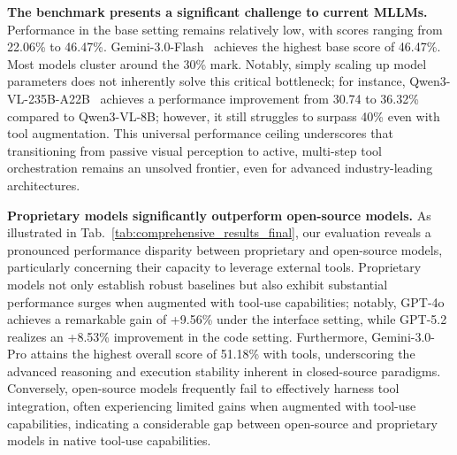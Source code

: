 \documentclass[runningheads]{llncs}
\begin{document}

\noindent \textbf{The benchmark presents a significant challenge to current MLLMs.} Performance in the base setting remains relatively low, with scores ranging from 22.06\% to 46.47\%. Gemini-3.0-Flash~\cite{google2025gemini3flash} achieves the highest base score of 46.47\%.
Most models cluster around the 30\% mark.
Notably, simply scaling up model parameters does not inherently solve this critical bottleneck; for instance, Qwen3-VL-235B-A22B~\cite{qwen3-vl} achieves a performance improvement from 30.74 to 36.32\% compared to Qwen3-VL-8B; however, it still struggles to surpass 40\% even with tool augmentation.
This universal performance ceiling underscores that transitioning from passive visual perception to active, multi-step tool orchestration remains an unsolved frontier, even for advanced industry-leading architectures.

\noindent \textbf{Proprietary models significantly outperform open-source models.}
As illustrated in Tab.~\ref{tab:comprehensive_results_final}, our evaluation reveals a pronounced performance disparity between proprietary and open-source models, particularly concerning their capacity to leverage external tools. 
Proprietary models not only establish robust baselines but also exhibit substantial performance surges when augmented with tool-use capabilities; 
notably, GPT-4o achieves a remarkable gain of +9.56\% under the interface setting, while GPT-5.2 realizes an +8.53\% improvement in the code setting. Furthermore, Gemini-3.0-Pro attains the highest overall score of 51.18\% with tools, underscoring the advanced reasoning and execution stability inherent in closed-source paradigms. 
Conversely, open-source models frequently fail to effectively harness tool integration, often experiencing limited gains when augmented with tool-use capabilities, indicating a considerable gap between open-source and proprietary models in native tool-use capabilities.
\end{document}
